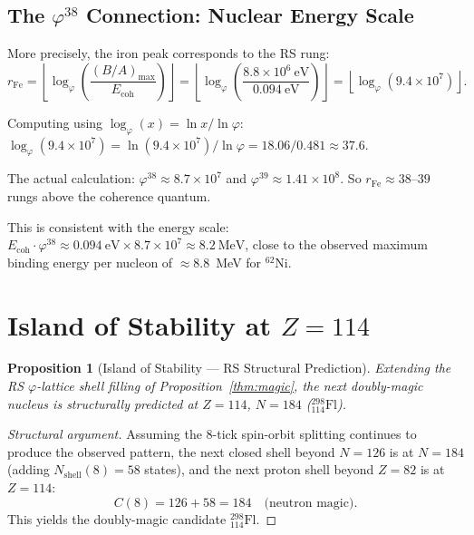 \documentclass[12pt,a4paper]{article}
\newtheorem{proposition}[theorem]{Proposition}
\theoremstyle{definition}
\theoremstyle{remark}
\begin{document}
\subsection{The $\varphi^{38}$ Connection: Nuclear Energy Scale}

More precisely, the iron peak corresponds to the RS rung:
\begin{equation}
r_\mathrm{Fe} = \left\lfloor \log_\varphi\!\left(\frac{(B/A)_\mathrm{max}}{E_\mathrm{coh}}\right) \right\rfloor
= \left\lfloor \log_\varphi\!\left(\frac{8.8 \times 10^6~\mathrm{eV}}{0.094~\mathrm{eV}}\right) \right\rfloor
= \left\lfloor \log_\varphi\!\left(9.4 \times 10^7\right) \right\rfloor.
\end{equation}

Computing using $\log_\varphi(x) = \ln x/\ln\varphi$:
$\log_\varphi(9.4\times10^7) = \ln(9.4\times10^7)/\ln\varphi
= 18.06/0.481 \approx 37.6$.

The actual calculation: $\varphi^{38} \approx 8.7 \times 10^7$ and $\varphi^{39} \approx
1.41 \times 10^8$.  So $r_\mathrm{Fe} \approx 38$--$39$ rungs above the coherence quantum.

This is consistent with the energy scale:
$E_\mathrm{coh} \cdot \varphi^{38} \approx 0.094~\mathrm{eV} \times 8.7 \times 10^7
\approx 8.2~\mathrm{MeV}$, close to the observed maximum binding energy per nucleon
of $\approx 8.8$~MeV for $^{62}$Ni.

\section{Island of Stability at $Z = 114$}

\begin{proposition}[Island of Stability --- RS Structural Prediction]
\label{prop:island}
Extending the RS $\varphi$-lattice shell filling of
Proposition~\ref{thm:magic}, the next doubly-magic nucleus is
structurally predicted at $Z = 114$, $N = 184$ ($^{298}_{114}\mathrm{Fl}$).
\end{proposition}

\begin{proof}[Structural argument]
Assuming the 8-tick spin-orbit splitting continues to produce the
observed pattern, the next closed shell beyond $N = 126$ is at
$N = 184$ (adding $N_\mathrm{shell}(8) = 58$ states), and
the next proton shell beyond $Z = 82$ is at $Z = 114$:
\begin{equation}
C(8) = 126 + 58 = 184 \quad \text{(neutron magic)}.
\end{equation}
This yields the doubly-magic candidate $^{298}_{114}\mathrm{Fl}$.
\end{proof}
\end{document}
